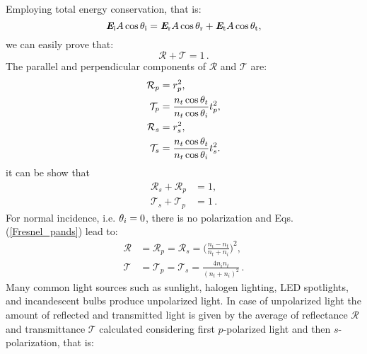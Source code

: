 Employing total energy conservation, that is:
\begin{equation}
\textit{\textbf{E}}_\textrm{i} A\cos\theta_\textrm{i} = \textit{\textbf{E}}_\textrm{r} A\cos\theta_\textrm{r}+\textit{\textbf{E}}_\textrm{t} A\cos\theta_\textrm{t},
\end{equation}
we can easily prove that:
\begin{equation}
\mathcal{R}+\mathcal{T}=1\,.
\end{equation}
 The parallel and perpendicular components of $\mathcal{R}$ and $\mathcal{T}$ are:
\begin{equation}\label{Fresnel_pands}
\begin{split}
\mathcal{R}_p& =  {r_p^2},\\
\mathcal{T}_p &=  \frac{n_t \cos\theta_t}{n_t \cos\theta_i}t_p^2,\\
\mathcal{R}_s &=  r_s^2,\\
\mathcal{T}_s &= \frac{n_t \cos\theta_t}{n_t \cos\theta_i}t_s^2.\\
\end{split}
\end{equation}
it can be show that
\begin{equation}
\begin{split}
\mathcal{R}_s+\mathcal{R}_p &= 1,\\
\mathcal{T}_s+\mathcal{T}_p &=1\,.
\end{split}
\end{equation}
For normal incidence, i.e. $\theta_i = 0$, there is no polarization and Eqs. (\ref{Fresnel_pands}) lead to:
\begin{equation}\label{eq:fresnel_pands2}
\begin{split}
\mathcal{R} &= \mathcal{R}_p = \mathcal{R}_s = \Bigg(\frac{n_i-n_t}{n_t+n_i}\Bigg)^2, \\
\mathcal{T} &= \mathcal{T}_p = \mathcal{T}_s = \frac{4n_i n_t}{(n_t+n_i)^2}\,.
\end{split}
\end{equation}
\indent %
Many common light sources such as sunlight, halogen lighting, LED spotlights, and incandescent bulbs produce unpolarized light. 
In case of unpolarized light the amount of reflected and transmitted light is given by the average of reflectance $\mathcal{R}$ and transmittance $\mathcal{T}$ calculated considering first $p$-polarized light and then $s$-polarization, that is:
